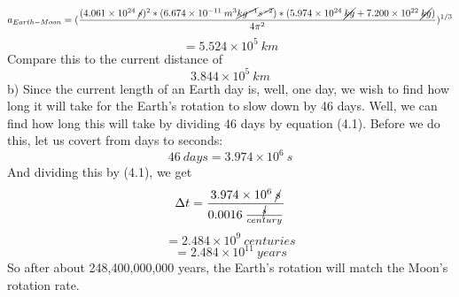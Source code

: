 \documentclass{article}
\begin{document}
    \[a_{Earth-Moon} = (\frac{(4.061 \times 10^{24} \: \cancel{s})^2 * (6.674 \times 10^{-11} \:m^3\cancel{kg^{-1}}\cancel{s^{-2}})*(5.974 \times 10^{24} \: \cancel{kg} + 7.200 \times 10^{22} \: \cancel{kg})}{4 \pi^2})^{1/3} \]
\[ = 5.524 \times 10^5 \: km\]
Compare this to the current distance of 
\[3.844 \times 10^5 \: km\]
b) Since the current length of an Earth day is, well, one day, we wish to find how long it will take for the Earth's rotation to slow down by 46 days. Well, we can find how long this will take by dividing 46 days by equation (4.1).
Before we do this, let us covert from days to seconds:
\[46 \: days = 3.974 \times 10^6 \: s\]
And dividing this by (4.1), we get
\[\Delta t = \frac{3.974 \times 10^6 \: \cancel{s} }{0.0016 \: \frac{\cancel{s}}{century}}\]
\[ = 2.484 \times 10^9 \: centuries\]
\[ = 2.484 \times 10^{11} \: years\]
So after about 248,400,000,000 years, the Earth's rotation will match the Moon's rotation rate.
\end{document}
